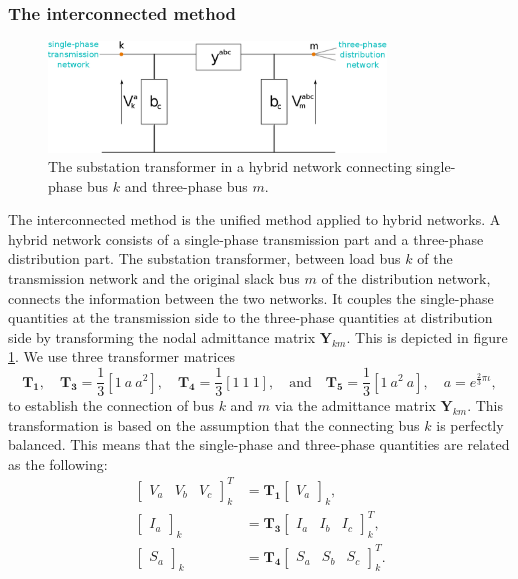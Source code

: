 \documentclass[10pt,journal]{article}
\begin{document}
\subsubsection{{The interconnected method}}
\begin{figure}[h]
    \centering
    \includegraphics[width=0.8\textwidth]{Images/substationtransformer.eps}
    \caption{The substation transformer in a hybrid network connecting single-phase bus $k$ and three-phase bus $m$.}
    \label{fig:subtrans}
\end{figure}
\label{sect:ic}
The interconnected method is the unified method applied to hybrid networks. A hybrid network consists of a single-phase transmission part and a three-phase distribution part. The substation transformer, between load bus $k$ of the transmission network and the original slack bus $m$ of the distribution network, connects the information between the two networks. It couples the single-phase quantities at the transmission side to the three-phase quantities at distribution side by transforming the nodal admittance matrix $\mathbf{Y}_{km}$. This is depicted in figure \ref{fig:subtrans}. We use three transformer matrices  \begin{equation}
    \mathbf{T_1}, \quad \mathbf{T_3}  = \frac{1}{3}[1\ a\ a^2],\quad \mathbf{T_4}= \frac{1}{3}\left[1 \ 1 \ 1 \right],\quad\mbox{and}\quad \mathbf{T_5}  =\frac{1}{3} \left[1 \ a^2\  a \right],\quad a = e^{\frac{2}{3}\pi\iota},
   \label{eq:T1T2}\nonumber  %
\end{equation} to establish the connection of bus $k$ and $m$ via the admittance matrix $\mathbf{Y}_{km}$. This transformation is based on the assumption that the connecting bus $k$ is perfectly balanced. This means that the single-phase and three-phase quantities are related as the following:
\begin{align}
    \begin{bmatrix}V_a & V_b & V_c\end{bmatrix}^T_k &= \mathbf{T_1}\begin{bmatrix}V_a\end{bmatrix}_k,    \label{eq:VA+}
\\
    \begin{bmatrix}I_a\end{bmatrix}_k &= \mathbf{T_3}\begin{bmatrix}I_a & I_b & I_c\end{bmatrix}^T_k,
    \label{eq:IA+}\\
     \begin{bmatrix}S_a\end{bmatrix}_k &= \mathbf{T_4}\begin{bmatrix}S_a & S_b & S_c \end{bmatrix}^T_k.\label{eq:SA+}
\end{align}
\end{document}
